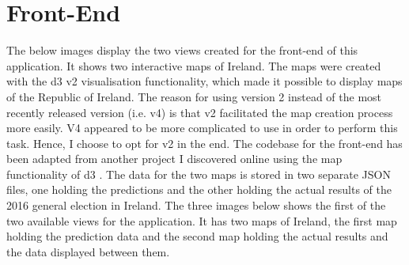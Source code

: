 \section{Front-End}
The below images display the two views created for the front-end of this application. It shows two interactive maps of Ireland. The maps were created with the d3 v2 visualisation functionality, which made it possible to display maps of the Republic of Ireland. The reason for using version 2 instead of the most recently released version (i.e. v4) is that v2 facilitated the map creation process more easily. V4 appeared to be more complicated to use in order to perform this task. Hence, I choose to opt for v2 in the end. 
The codebase for the front-end has been adapted from another project I discovered online using the map functionality of d3 \cite{tax}. The data for the two maps is stored in two separate JSON files, one holding the predictions and the other holding the actual results of the 2016 general election in Ireland.  The three images below shows the first of the two available views for the application. It has two maps of Ireland, the first map holding the prediction data and the second map holding the actual results and the data displayed between them. 

